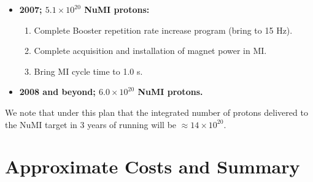 \documentclass{article}
\begin{document}
\begin {itemize}
\begin {enumerate}
   \item Complete fabrication of larger aperture Booster RF cavities. 
         Continue installing and commissioning.
   \item Continue to improve stacking operation by tuning in Booster and
         MI. Fabricate additional control devices as necessary.
   \item Continue acquisition of additional magnet power for MI. Continue
         installation. 
   \end {enumerate}
\item {\bf 2007; $5.1 \times 10^{20}$ NuMI protons:}
   \begin {enumerate}
   \item Complete Booster repetition rate increase program (bring to 15 Hz).
   \item Complete acquisition and installation of magnet power in MI.
   \item Bring MI cycle time to 1.0 s.
   \end {enumerate}
\item {\bf 2008 and beyond; $6.0 \times 10^{20}$ NuMI protons.}
\end {itemize}

We note that under this plan that the integrated number of protons delivered
to the NuMI target in 3 years of running will be 
$\approx 14 \times 10^{20}$.

\section {Approximate Costs and Summary}
\end{document}
